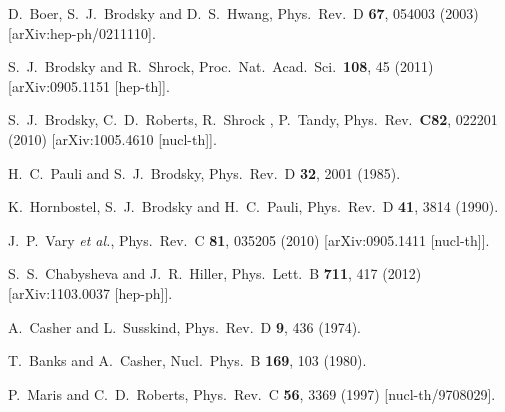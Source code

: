 \documentclass[prd,aps,onecolumn,nofootinbib]{revtex4}
\begin{document}
\begin{thebibliography}{99}
  D.~Boer, S.~J.~Brodsky and D.~S.~Hwang,
  Phys.\ Rev.\  D {\bf 67}, 054003 (2003)
  [arXiv:hep-ph/0211110].
  
  S.~J.~Brodsky and R.~Shrock,
  Proc.\ Nat.\ Acad.\ Sci.\  {\bf 108}, 45 (2011)
  [arXiv:0905.1151 [hep-th]].
  
  S.~J.~Brodsky, C.~D.~Roberts, R.~Shrock , P.~Tandy,
  Phys.\ Rev.\  {\bf C82}, 022201 (2010)
  [arXiv:1005.4610 [nucl-th]].
  

  
  H.~C.~Pauli and S.~J.~Brodsky,
  Phys.\ Rev.\  D {\bf 32}, 2001 (1985).

  K.~Hornbostel, S.~J.~Brodsky and H.~C.~Pauli,
  Phys.\ Rev.\  D {\bf 41}, 3814 (1990).

  J.~P.~Vary {\it et al.},
  Phys.\ Rev.\  C {\bf 81}, 035205 (2010)
  [arXiv:0905.1411 [nucl-th]].

  S.~S.~Chabysheva and J.~R.~Hiller,
  Phys.\ Lett.\  B {\bf 711}, 417 (2012)
  [arXiv:1103.0037 [hep-ph]].
  
  A.~Casher and L.~Susskind,
  Phys.\ Rev.\  D {\bf 9}, 436 (1974).
  
  T.~Banks and A.~Casher,
  Nucl.\ Phys.\ B {\bf 169}, 103 (1980).
 
 P.~Maris and C.~D.~Roberts,
  Phys.\ Rev.\ C {\bf 56}, 3369 (1997)
 [nucl-th/9708029].


\end{thebibliography}
\end{document}
